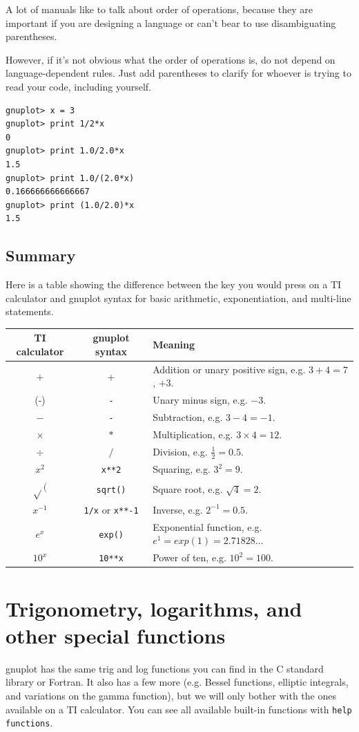 \documentclass[11pt,letterpaper]{report}
\begin{document}
A lot of manuals like to talk about order of operations, because they are important if you are designing a language or can't bear to use disambiguating parentheses.

However, if it's not obvious what the order of operations is, do not depend on language-dependent rules. Just add parentheses to clarify for whoever is trying to read your code, including yourself.

\begin{verbatim}
gnuplot> x = 3
gnuplot> print 1/2*x
0
gnuplot> print 1.0/2.0*x
1.5
gnuplot> print 1.0/(2.0*x)
0.166666666666667
gnuplot> print (1.0/2.0)*x
1.5
\end{verbatim}

\section{Summary}

Here is a table showing the difference between the key you would press on a TI calculator and gnuplot syntax for basic arithmetic, exponentiation, and multi-line statements.

\noindent
\begin{tabular}{|c|c|l|}
\hline 
TI calculator & gnuplot syntax & Meaning \\ 
\hline 
$+$ & \lstinline+++ & Addition or unary positive sign, e.g. $3+4=7$, $+3$. \\ 
\hline 
(-) & \lstinline+-+ & Unary minus sign, e.g. $-3$. \\ 
\hline 
$-$ & \lstinline+-+ & Subtraction, e.g. $3-4=-1$. \\ 
\hline
$\times$ & $*$ & Multiplication, e.g. $3 \times 4 = 12$. \\ 
\hline 
$\div$ & $/$ & Division, e.g. $\frac{1}{2} = 0.5$. \\ 
\hline
$x^2$ & \lstinline+x**2+ & Squaring, e.g. $3^2=9$. \\ 
\hline 
$\sqrt{}($ & \lstinline+sqrt()+ & Square root, e.g. $\sqrt{4}=2$. \\ 
\hline 
$x^{-1}$ & \lstinline+1/x+ or \lstinline+x**-1+ & Inverse, e.g. $2^{-1} = 0.5$. \\ 
\hline
$e^x$ & \lstinline+exp()+ & Exponential function, e.g. $e^1=exp(1)=2.71828...$ \\ 
\hline
$10^x$ & \lstinline+10**x+ & Power of ten, e.g. $10^2=100$. \\ 
\hline
\end{tabular} 

\chapter{Trigonometry, logarithms, and other special functions}
gnuplot has the same trig and log functions you can find in the C standard library or Fortran. It also has a few more (e.g. Bessel functions, elliptic integrals, and variations on the gamma function), but we will only bother with the ones available on a TI calculator. You can see all available built-in functions with \verb+help functions+.
\end{document}
